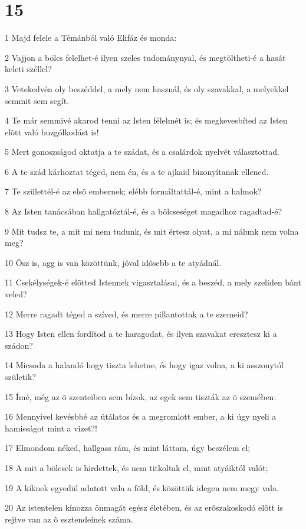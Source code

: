 \chapter{15}

\par 1 Majd felele a Témánból való Elifáz és monda:
\par 2 Vajjon a bölcs felelhet-é ilyen szeles tudománynyal, és megtöltheti-é a hasát keleti széllel?
\par 3 Vetekedvén oly beszéddel, a mely nem használ, és oly szavakkal, a melyekkel semmit sem segít.
\par 4 Te már semmivé akarod tenni az Isten félelmét is; és megkevesbíted az Isten elõtt való buzgólkodást is!
\par 5 Mert gonoszságod oktatja a te szádat, és a csalárdok nyelvét választottad.
\par 6 A te szád kárhoztat téged, nem én, és a te ajkaid bizonyítanak ellened.
\par 7 Te születtél-é az elsõ embernek; elébb formáltattál-é, mint a halmok?
\par 8 Az Isten tanácsában hallgatóztál-é, és a bölcseséget magadhoz ragadtad-é?
\par 9 Mit tudsz te, a mit mi nem tudunk, és mit értesz olyat, a mi nálunk nem volna meg?
\par 10 Õsz is, agg is van közöttünk, jóval idõsebb a te atyádnál.
\par 11 Csekélységek-é elõtted Istennek vigasztalásai, és a beszéd, a mely szeliden bánt veled?
\par 12 Merre ragadt téged a szíved, és merre pillantottak a te szemeid?
\par 13 Hogy Isten ellen fordítod a te haragodat, és ilyen szavakat eresztesz ki a szádon?
\par 14 Micsoda a halandó hogy tiszta lehetne, és hogy igaz volna, a ki asszonytól születik?
\par 15 Ímé, még az õ szenteiben sem bízok, az egek sem tiszták az õ szemében:
\par 16 Mennyivel kevésbbé az útálatos és a megromlott ember, a ki úgy nyeli a hamisságot mint a vizet?!
\par 17 Elmondom néked, hallgass rám, és mint láttam, úgy beszélem el;
\par 18 A mit a bölcsek is hirdettek, és nem titkoltak el, mint atyáiktól valót;
\par 19 A kiknek egyedül adatott vala a föld, és közöttük idegen nem megy vala.
\par 20 Az istentelen kínozza önmagát egész életében, és az erõszakoskodó elõtt is rejtve van az õ esztendeinek száma.
